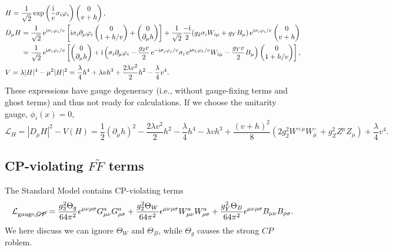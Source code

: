 \documentclass[CheatSheet]{subfiles}
\begin{document}
\begin{align}
&H=\frac1{\sqrt2}\exp\left(\frac{\mathrm{i}}{v}\sigma_i\varphi_i\right)\begin{pmatrix}0\\v+h\end{pmatrix},
\\&
 D_\mu H
= \frac1{\sqrt2}\mathop{}\!\mathrm{e}^{\mathrm{i}\sigma_i\varphi_i/v}
\left[\mathrm{i}\sigma_i\partial_\mu\varphi_i\begin{pmatrix}0\\1+h/v\end{pmatrix} + \begin{pmatrix}0\\\partial_\mu h\end{pmatrix}\right]
+\frac1{\sqrt2}\frac{-\mathrm{i}}{2}(g_2\sigma_i W_{i\mu}+g_Y B_\mu)
\mathop{}\!\mathrm{e}^{\mathrm{i}\sigma_i\varphi_i/v}\begin{pmatrix}0\\v+h\end{pmatrix}
\\&\phantom{D_\mu H}
= \frac1{\sqrt2}\mathop{}\!\mathrm{e}^{\mathrm{i}\sigma_i\varphi_i/v}
\left[
\begin{pmatrix}0\\\partial_\mu h\end{pmatrix}
+
\mathrm{i}
\left(
\sigma_i\partial_\mu\varphi_i
-\frac{g_2v}{2}
\mathop{}\!\mathrm{e}^{-\mathrm{i}\sigma_j\varphi_j/v}
\sigma_i
\mathop{}\!\mathrm{e}^{\mathrm{i}\sigma_k\varphi_k/v}
W_{i\mu}-
\frac{g_Y v}{2}B_\mu
\right)
\begin{pmatrix}0\\1+h/v\end{pmatrix}\right],
\\&V=\lambda|H|^4-\mu^2|H|^2=
\frac{\lambda}{4}h^4+\lambda v h^3+\frac{2\lambda v^2}{2}h^2-\frac{\lambda}{4}v^4.
\end{align}
These expressions have gauge degeneracy (i.e., without gauge-fixing terms and  ghost terms) and thus not ready for calculations.
If we choose the unitarity gauge, $\phi_i(x)=0$,
\begin{equation}
\mathcal L_H= |D_\mu H|^2-V(H)=\frac12(\partial_\mu h)^2-\frac{2\lambda v^2}{2}h^2
-\frac{\lambda}{4}h^4-\lambda v h^3
 + \frac{(v+h)^2}{8}(2g_2^2 W^{+\mu}W^-_\mu+g_Z^2Z^\mu Z_\mu)
+\frac{\lambda}{4}v^4.
\end{equation}


\subsection[CP-violating FFdual terms]{CP-violating $F\tilde F$ terms}
\label{sec:SM-FFdual}
The Standard Model contains CP-violating terms
\begin{equation}
 \mathcal L_{\text{gauge},\cancel{CP}}
=
\frac{g_3^2\Theta_g}{64\pi^2}\epsilon^{\mu\nu\rho\sigma}G^a_{\mu\nu}G^a_{\rho\sigma}
+\frac{g_2^2\Theta_W}{64\pi^2}\epsilon^{\mu\nu\rho\sigma}W^a_{\mu\nu}W^a_{\rho\sigma}
+\frac{g_Y^2\Theta_B}{64\pi^2}\epsilon^{\mu\nu\rho\sigma}B_{\mu\nu}B_{\rho\sigma}.
\end{equation}
We here discuss we can ignore $\Theta_W$ and $\Theta_B$, while $\Theta_g$ causes the strong $CP$ roblem.
\end{document}
